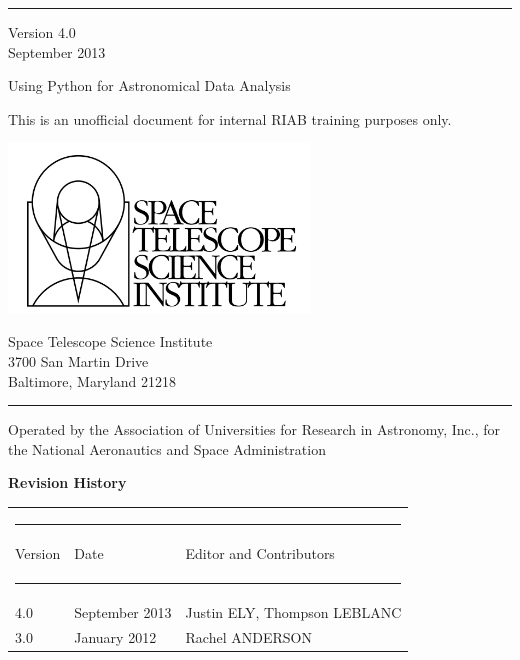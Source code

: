 \begin{titlepage}
\rule{165mm}{0.8mm}
 Version 4.0 \\
 September 2013

\vspace{30mm}
{\Huge Using Python for Astronomical Data Analysis }

\vspace{10mm}
{\large This is an unofficial document for internal RIAB training purposes only.}
\vspace{65mm}

\begin{minipage}[l]{80mm}
\includegraphics[width=8cm]{logo.jpg}

\end{minipage}
%
\hspace{5mm}
\begin{minipage}[u]{75mm}
\begin{flushright}
Space Telescope Science Institute \\
3700 San Martin Drive \\
Baltimore, Maryland 21218
\end{flushright}
\end{minipage}

\rule{165mm}{0.8mm}

{\scriptsize Operated by the Association of Universities for Research in Astronomy, Inc., for the National Aeronautics and Space Administration }
 
 \newpage
  \thispagestyle{empty}  
  
{\Large \bf Revision History}



\begin{table}[h]
\begin{tabular}{lll} 
\multicolumn{3}{c}{ \rule{130mm}{0.2mm}}      \\
Version  & Date & Editor and Contributors    {\rule [-3mm]{0mm}{8mm}  }\\ 
 \multicolumn{3}{c}{ \rule[2mm]{130mm}{0.8mm}}      \\
      4.0                 &  September 2013 & Justin ELY, Thompson LEBLANC \\
      3.0                 &  January 2012  & Rachel ANDERSON  \\ 
 

\end{tabular}
\end{table}
\end{titlepage}
